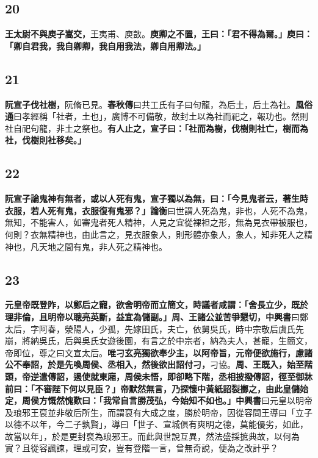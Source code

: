 \subsection*{20}

\textbf{王太尉不與庾子嵩交，}{\footnotesize 王夷甫、庾敳。}\textbf{庾卿之不置，王曰：「君不得為爾。」庾曰：「卿自君我，我自卿卿，我自用我法，卿自用卿法。」}

\subsection*{21}

\textbf{阮宣子伐社樹，}{\footnotesize 阮脩已見。\textbf{春秋傳}曰共工氏有子曰句龍，為后土，后土為社。\textbf{風俗通}曰孝經稱「社者，土也」，廣博不可備敬，故封土以為社而祀之，報功也。然則社自祀句龍，非土之祭也。}\textbf{有人止之，宣子曰：「社而為樹，伐樹則社亡，樹而為社，伐樹則社移矣。」}

\subsection*{22}

\textbf{阮宣子論鬼神有無者，或以人死有鬼，宣子獨以為無，曰：「今見鬼者云，著生時衣服，若人死有鬼，衣服復有鬼邪？」}{\footnotesize \textbf{論衡}曰世謂人死為鬼，非也，人死不為鬼，無知，不能害人，如審鬼者死人精神，人見之宜從裸袒之形，無為見衣帶被服也，何則？衣無精神也，由此言之，見衣服象人，則形體亦象人，象人，知非死人之精神也，凡天地之間有鬼，非人死之精神也。}

\subsection*{23}

\textbf{元皇帝既登阼，以鄭后之寵，欲舍明帝而立簡文，時議者咸謂：「舍長立少，既於理非倫，且明帝以聰亮英斷，益宜為儲副。」周、王諸公並苦爭懇切，}{\footnotesize \textbf{中興書}曰鄭太后，字阿春，滎陽人，少孤，先嫁田氏，夫亡，依舅吳氏，時中宗敬后虞氏先崩，將納吳氏，后與吳氏女遊後園，有言之於中宗者，納為夫人，甚寵，生簡文，帝即位，尊之曰文宣太后。}\textbf{唯刁玄亮獨欲奉少主，以阿帝旨，元帝便欲施行，慮諸公不奉詔，於是先喚周侯、丞相入，然後欲出詔付刁，}{\footnotesize 刁協。}\textbf{周、王既入，始至階頭，帝逆遣傳詔，遏使就東廂，周侯未悟，即卻略下階，丞相披撥傳詔，徑至御牀前曰：「不審陛下何以見臣？」帝默然無言，乃探懷中黃紙詔裂擲之，由此皇儲始定，周侯方慨然愧歎曰：「我常自言勝茂弘，今始知不如也。」}{\footnotesize \textbf{中興書}曰元皇以明帝及琅邪王裒並非敬后所生，而謂裒有大成之度，勝於明帝，因從容問王導曰「立子以德不以年，今二子孰賢」，導曰「世子、宣城俱有爽明之德，莫能優劣，如此，故當以年」，於是更封裒為琅邪王。而此與世說互異，然法盛採摭典故，以何為實？且從容諷諫，理或可安，豈有登階一言，曾無奇說，便為之改計乎？}

